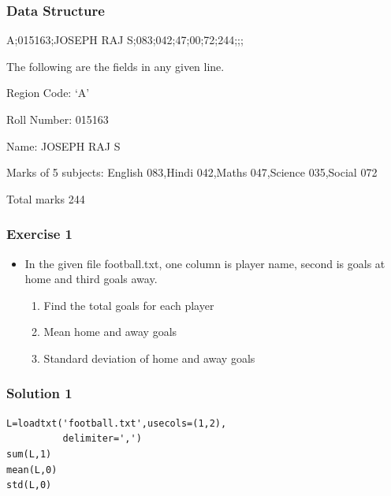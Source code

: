 \documentclass[17pt]{beamer}
\begin{document}
\begin{frame}
\frametitle{Data Structure}
\label{sec-4}

{\footnotesize A;015163;JOSEPH RAJ S;083;042;47;00;72;244;;;}

  The following are the fields in any given line.

\begin{itemize}
\begin{small}
\item Region Code: `A'
\item Roll Number: 015163
\item Name: JOSEPH RAJ S
\item Marks of 5 subjects: English 083,Hindi 042,Maths 047,Science 035,Social 072
\item Total marks 244
\end{small}
\end{itemize}
\end{frame}
\begin{frame}
\frametitle{Exercise 1}
\label{sec-5}

\begin{itemize}
\item In the given file football.txt, 
    one column is player name, second is goals at home 
    and third goals away.\pause
\vspace{8pt}
\begin{enumerate}
\item Find the total goals for each player\pause
\item Mean home and away goals\pause
\item Standard deviation of home and away goals
\end{enumerate}
\end{itemize}
\end{frame}
\begin{frame}[fragile]
\frametitle{Solution 1}
\label{sec-6}

\lstset{language=Python}
\begin{lstlisting}
L=loadtxt('football.txt',usecols=(1,2),
          delimiter=',')
sum(L,1)
mean(L,0)
std(L,0)
\end{lstlisting}
\end{frame}
\end{document}
